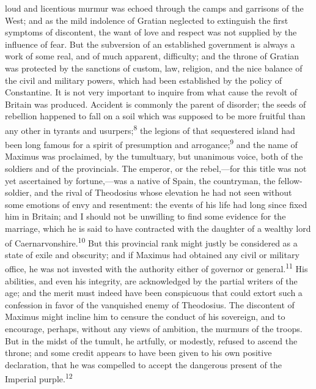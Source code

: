 loud and licentious murmur was echoed through the camps and
garrisons of the West; and as the mild indolence of Gratian
neglected to extinguish the first symptoms of discontent, the
want of love and respect was not supplied by the influence of
fear. But the subversion of an established government is always a
work of some real, and of much apparent, difficulty; and the
throne of Gratian was protected by the sanctions of custom, law,
religion, and the nice balance of the civil and military powers,
which had been established by the policy of Constantine. It is
not very important to inquire from what cause the revolt of
Britain was produced. Accident is commonly the parent of
disorder; the seeds of rebellion happened to fall on a soil which
was supposed to be more fruitful than any other in tyrants and
usurpers;\textsuperscript{8} the legions of that sequestered island had been long
famous for a spirit of presumption and arrogance;\textsuperscript{9} and the name
of Maximus was proclaimed, by the tumultuary, but unanimous
voice, both of the soldiers and of the provincials. The emperor,
or the rebel,—for this title was not yet ascertained by
fortune,—was a native of Spain, the countryman, the
fellow-soldier, and the rival of Theodosius whose elevation he
had not seen without some emotions of envy and resentment: the
events of his life had long since fixed him in Britain; and I
should not be unwilling to find some evidence for the marriage,
which he is said to have contracted with the daughter of a
wealthy lord of Caernarvonshire.\textsuperscript{10} But this provincial rank
might justly be considered as a state of exile and obscurity; and
if Maximus had obtained any civil or military office, he was not
invested with the authority either of governor or general.\textsuperscript{11} His
abilities, and even his integrity, are acknowledged by the
partial writers of the age; and the merit must indeed have been
conspicuous that could extort such a confession in favor of the
vanquished enemy of Theodosius. The discontent of Maximus might
incline him to censure the conduct of his sovereign, and to
encourage, perhaps, without any views of ambition, the murmurs of
the troops. But in the midst of the tumult, he artfully, or
modestly, refused to ascend the throne; and some credit appears
to have been given to his own positive declaration, that he was
compelled to accept the dangerous present of the Imperial purple.\textsuperscript{12}


